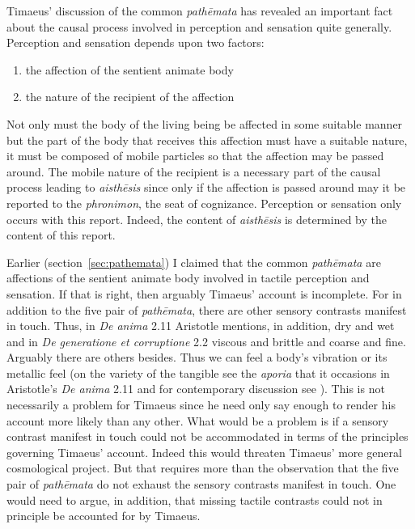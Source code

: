 Timaeus' discussion of the common \emph{pathēmata} has revealed an important fact about the causal process involved in perception and sensation quite generally. Perception and sensation depends upon two factors:
\begin{enumerate}[(1)]
	\item the affection of the sentient animate body
	\item the nature of the recipient of the affection
\end{enumerate}
Not only must the body of the living being be affected in some suitable manner but the part of the body that receives this affection must have a suitable nature, it must be composed of mobile particles so that the affection may be passed around. The mobile nature of the recipient is a necessary part of the causal process leading to \emph{aisthēsis} since only if the affection is passed around may it be reported to the \emph{phronimon}, the seat of cognizance. Perception or sensation only occurs with this report. Indeed, the content of \emph{aisthēsis} is determined by the content of this report.

Earlier (section~\ref{sec:pathemata}) I claimed that the common \emph{pathēmata} are affections of the sentient animate body involved in tactile perception and sensation. If that is right, then arguably Timaeus' account is incomplete. For in addition to the five pair of \emph{pathēmata}, there are other sensory contrasts manifest in touch. Thus, in \emph{De anima} 2.11 Aristotle mentions, in addition, dry and wet and in \emph{De generatione et corruptione} 2.2 viscous and brittle and coarse and fine. Arguably there are others besides. Thus we can feel a body's vibration or its metallic feel (on the variety of the tangible see the \emph{aporia} that it occasions in Aristotle's \emph{De anima} 2.11 and for contemporary discussion see \citealt{Fulkerson:2014ek}). This is not necessarily a problem for Timaeus since he need only say enough to render his account more likely than any other. What would be a problem is if a sensory contrast manifest in touch could not be accommodated in terms of the principles governing Timaeus' account. Indeed this would threaten Timaeus' more general cosmological project. But that requires more than the observation that the five pair of \emph{pathēmata} do not exhaust the sensory contrasts manifest in touch. One would need to argue, in addition, that missing tactile contrasts could not in principle be accounted for by Timaeus.





